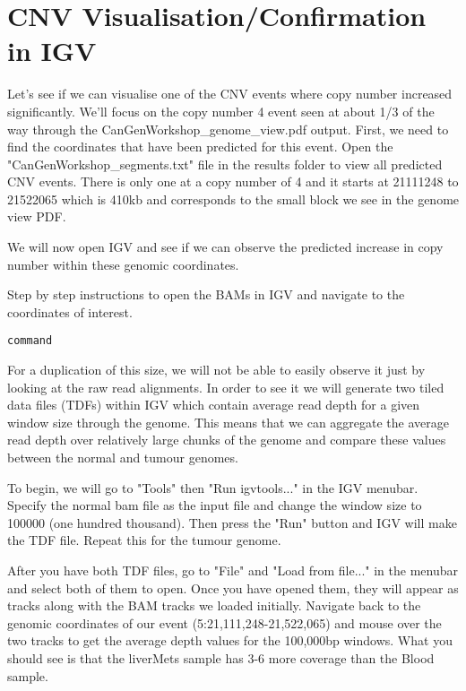 \section{CNV Visualisation/Confirmation in IGV}

Let's see if we can visualise one of the CNV events where copy number increased significantly. We'll focus on the copy number 4 event seen at about 1/3 of the way through the CanGenWorkshop_genome_view.pdf output. First, we need to find the coordinates that have been predicted for this event. Open the "CanGenWorkshop_segments.txt" file in the results folder to view all predicted CNV events. There is only one at a copy number of 4 and it starts at 21111248 to 21522065 which is 410kb and corresponds to the small block we see in the genome view PDF.

We will now open IGV and see if we can observe the predicted increase in copy number within these genomic coordinates.

\begin{steps}
Step by step instructions to open the BAMs in IGV and navigate to the coordinates of interest.

\begin{lstlisting}
command
\end{lstlisting}
\end{steps}

For a duplication of this size, we will not be able to easily observe it just by looking at the raw read alignments. In order to see it we will generate two tiled data files (TDFs) within IGV which contain average read depth for a given window size through the genome. This means that we can aggregate the average read depth over relatively large chunks of the genome and compare these values between the normal and tumour genomes.

To begin, we will go to "Tools" then "Run igvtools..." in the IGV menubar. Specify the normal bam file as the input file and change the window size to 100000 (one hundred thousand). Then press the "Run" button and IGV will make the TDF file. Repeat this for the tumour genome.

After you have both TDF files, go to "File" and "Load from file..." in the menubar and select both of them to open. Once you have opened them, they will appear as tracks along with the BAM tracks we loaded initially. Navigate back to the genomic coordinates of our event (5:21,111,248-21,522,065) and mouse over the two tracks to get the average depth values for the 100,000bp windows. What you should see is that the liverMets sample has 3-6 more coverage than the Blood sample.

